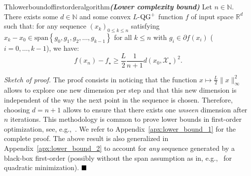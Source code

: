 
\begin{center}
\begin{restatable}{Th}{lowerboundoffirstorderalgorithm}\textbf{\emph{(Lower complexity bound)}}
    \label{thm:general_lower_bound}
    Let $n\in\mathbb{N}$. There exists some $d\in\mathbb{N}$ and some convex $L$-$\operatorname{QG}^+$ function $f$ of input space $\mathbb{R}^d$ such that: for any sequence $(x_k)_{0\le k\le n}$ satisfying $x_k - x_0 \in \text{span}\left\{g_0, g_1, g_2, \dots, g_{k-1}\right\}$ for all $k\leq n$ with $g_i \in \partial f(x_i)$ ($i=0,\ldots,k-1$), we have:
    \[f(x_n) - f_\star \geq \frac{L}{2}\frac{1}{n+1} d(x_0, \mathcal{X}_\star)^2.\]
\end{restatable}
\end{center}

\noindent \textit{Sketch of proof.}
    The proof consists in noticing that the function $x \mapsto \frac{L}{2}\|x\|_\infty^2$ allows to explore one new dimension per step and that this new dimension is independent of the way the next point in the sequence is chosen. Therefore, choosing $d=n+1$ allows to ensure that there exists one \textit{unseen} dimension after $n$ iterations. This methodology is common to prove lower bounds in first-order optimization, see, e.g.,~\citep{nemirovskinotes1995,Nest03a,bubeck2014convex}. We refer to Appendix~\ref{apx:lower_bound_1} for the complete proof. The above result is also generalized in Appendix~\ref{apx:lower_bound_2} to account for \textit{any} sequence generated by a black-box first-order (possibly without the span assumption as in, e.g.,~\citep[Chapter 12]{nemirovskinotes1995} for quadratic minimization).
$\hfill\blacksquare$

